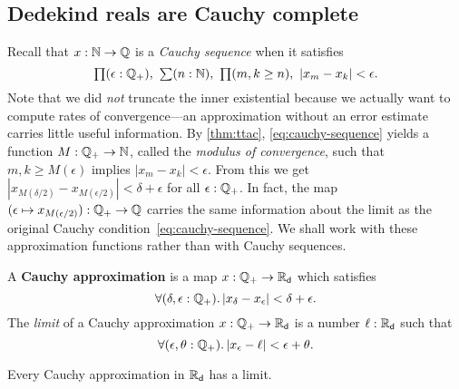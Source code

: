 \subsection{Dedekind reals are Cauchy complete}
\label{sec:RD-cauchy-complete}

Recall that $x : \mathbb{N} \to \mathbb{Q}$ is a \emph{Cauchy sequence} when it satisfies
%
\begin{equation} \label{eq:cauchy-sequence}
  \prd{\epsilon : \Qp} \sm{n : \N} \prd{m, k \geq n} |x_m - x_k| < \epsilon.
\end{equation}
%
Note that we did \emph{not} truncate the inner existential because we actually want to
compute rates of convergence---an approximation without an error estimate carries little
useful information. By \autoref{thm:ttac}, \eqref{eq:cauchy-sequence} yields a function $M
: \mathbb{Q}_{+} \to \mathbb{N}$, called the \emph{modulus of convergence}, such that $m, k \geq M(\epsilon)$
implies $|x_m - x_k| < \epsilon$. From this we get $|x_{M(\delta/2)} - x_{M(\epsilon/2)}|<
\delta + \epsilon$ for all $\epsilon : \mathbb{Q}_{+}$. In fact, the map $(\epsilon \mapsto
x_{M(\epsilon/2)}) : \mathbb{Q}_{+} \to \mathbb{Q}$ carries the same information about the limit as the
original Cauchy condition~\eqref{eq:cauchy-sequence}. We shall work with these
approximation functions rather than with Cauchy sequences.

\begin{defn}\label{defn:cauchy-approximation}
  A \textbf{Cauchy approximation} is a map $x : \mathbb{Q}_{+} \to \mathbb{R}_\mathsf{d}$ which satisfies
  \begin{equation}
    \label{eq:cauchy-approx}
    \fall{\delta, \epsilon :\Qp} |x_\delta - x_\epsilon| < \delta + \epsilon.
  \end{equation}
  The \emph{limit} of a Cauchy approximation $x : \mathbb{Q}_{+} \to \mathbb{R}_\mathsf{d}$ is a number $\ell : \mathbb{R}_\mathsf{d}$ such
  that
  \begin{equation*}
    \fall{\epsilon, \theta : \Qp} |x_\epsilon - \ell| < \epsilon + \theta.
  \end{equation*}
\end{defn}

\begin{thm} \label{RD-cauchy-complete}
  Every Cauchy approximation in $\mathbb{R}_\mathsf{d}$ has a limit.
\end{thm}

